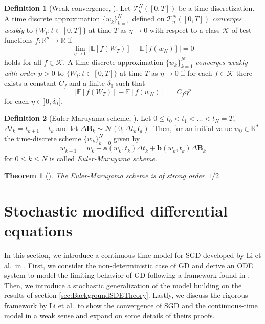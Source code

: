 \documentclass[12pt]{article}
\newtheorem{theorem}{Theorem}[section]
\theoremstyle{definition}
\newtheorem{definition}[definition]{Definition}
\numberwithin{equation}{section}
\newcommand{\R}{\mathbb{R}}
\newcommand{\CN}{\mathcal{N}}
\newcommand{\ev}[1]{\mathbb{E}\left[{#1}\right]}
\begin{document}
\begin{definition}[Weak convergence, ]
  \label{def:weak_convergence}
  Let $\mathcal{T}_\eta^N([0,T])$ be a time discretization. A time discrete approximation $\{w_k\}_{k=1}^N$ defined on $\mathcal{T}_\eta^N([0,T])$ \emph{converges weakly} to $\{W_t:t\in [0,T] \}$ at time $T$ as $\eta \rightarrow 0$ with respect to a class $\mathcal{K}$ of test functions $f: \R^n \rightarrow \R$ if 
  \begin{equation}
    \lim_{\eta \rightarrow 0} |\ev{f(W_T)} - \ev{f(w_N)}| = 0
  \end{equation}
  holds for all $f \in \mathcal{K}$.
  A time discrete approximation $\{w_k\}_{k=1}^N$ \emph{converges weakly with order} $p > 0$ to $\{W_t:t\in [0,T] \}$ at time $T$ as $\eta \rightarrow 0$ if for each $f \in \mathcal{K}$ there exists a constant $C_f$ and a finite $\delta_0$ such that 
  \begin{equation}
     |\ev{f(W_T)} - \ev{f(w_N)}| = C_f \eta^p
  \end{equation}
  for each $\eta \in ]0, \delta_0[$.
\end{definition}
\begin{definition}[Euler-Maruyama scheme, ]
  \label{def:euler_maruyama}
  Let $0 \leq t_0 < t_1 < \dots < t_N = T$, $\Delta t_k = t_{k+1} - t_k$ and let $\Delta \mathbf{B}_k \sim \CN(0,\Delta t_k I_d)$. Then, for an initial value $w_0 \in \R^d$ the time-discrete scheme $\{w_k\}_{k=0}^N$ given by
\begin{equation}
  \label{eq:euler_maruyama}
  w_{k+1} = w_k + \mathbf{a}(w_k, t_k)\Delta t_k + \mathbf{b}(w_k, t_k) \Delta \mathbf{B}_k
\end{equation}
for $0 \leq k \leq N$ is called \emph{Euler-Maruyama scheme}.
\end{definition}

\begin{theorem}[]
  The Euler-Maruyama scheme is of strong order~$1/2$.
\end{theorem}
\section{Stochastic modified differential equations}
\label{sec:sde_model}
In this section, we introduce a continuous-time model for SGD developed by Li et al.\ in \cite{liStochasticModifiedEquations2017}. First, we consider the non-deterministic case of GD and derive an ODE system to model the limiting behavior of GD following a framework found in \cite{hairerGeometricNumericalIntegration2013}. Then, we introduce a stochastic generalization of the model building on the results of section \autoref{sec:BackgroundSDETheory}. Lastly, we discuss the rigorous framework by Li et al.\ to show the convergence of SGD and the continuous-time model in a weak sense and expand on some details of theirs proofs.
\end{document}
